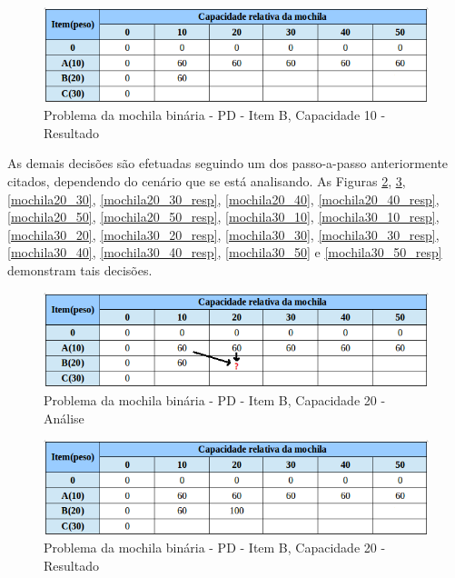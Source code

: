 \FloatBarrier
\begin{figure}[!h]
\centering
\includegraphics[keepaspectratio=true,scale=0.5]{figuras/mochila20_10_resp.png}
\caption{Problema da mochila binária - PD - Item B, Capacidade 10 - Resultado}
\label{mochila20_10_resp}
\end{figure}

As demais decisões são efetuadas seguindo um dos passo-a-passo anteriormente citados, dependendo do cenário que se está analisando. As Figuras \ref{mochila20_20}, \ref{mochila20_20_resp}, \ref{mochila20_30}, \ref{mochila20_30_resp}, \ref{mochila20_40}, \ref{mochila20_40_resp}, \ref{mochila20_50}, \ref{mochila20_50_resp}, \ref{mochila30_10}, \ref{mochila30_10_resp}, \ref{mochila30_20}, \ref{mochila30_20_resp}, \ref{mochila30_30}, \ref{mochila30_30_resp}, \ref{mochila30_40}, \ref{mochila30_40_resp}, \ref{mochila30_50} e \ref{mochila30_50_resp} demonstram tais decisões.
\FloatBarrier
\begin{figure}[!h]
\centering
\includegraphics[keepaspectratio=true,scale=0.6]{figuras/mochila20_20.png}
\caption{Problema da mochila binária - PD - Item B, Capacidade 20 - Análise}
\label{mochila20_20}
\end{figure}

\FloatBarrier
\begin{figure}[!h]
\centering
\includegraphics[keepaspectratio=true,scale=0.6]{figuras/mochila20_20_resp.png}
\caption{Problema da mochila binária - PD - Item B, Capacidade 20 - Resultado}
\label{mochila20_20_resp}
\end{figure}


